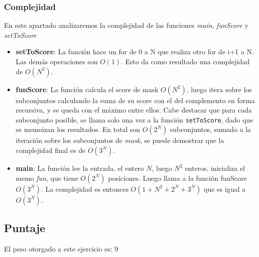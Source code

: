 \subsubsection{Complejidad}

En este apartado analizaremos la complejidad de las funciones \textit{main}, \textit{funScore} y \textit{setToScore}

\begin{itemize}
	\item \textbf{setToScore}: La funci\'on hace un for de 0 a N que realiza otro for de i+1 a N. Las dem\'as operaciones son $O(1)$. Esto da como resultado una complejidad de $O(N^2)$.

	\item \textbf{funScore}: La funci\'on calcula el score de mask $O(N^2)$, luego itera sobre los subconjuntos calculando la suma de su score con el del complemento en forma recursiva, y se queda con el m\'aximo entre ellos.
	Cabe destacar que para cada subconjunto posible, se llama solo una vez a la funci\'on \texttt{setToScore}, dado que se memoizan los resultados. En total son $O(2^N)$ subconjuntos, sumado a la iteraci\'on sobre los subconjuntos de \textit{mask}, se puede demostrar que la complejidad final es de $O(3^N)$.

	\item \textbf{main}: La funci\'on lee la entrada, el entero $N$, luego $N^2$ enteros, inicializa el memo \textit{fun}, que tiene $O(2^N)$ posiciones. Luego llama a la funci\'on funScore $O(3^N)$. La complejidad es entonces $O(1 + N^2 + 2^N + 3^N)$ que es igual a $O(3^N)$.
\end{itemize}

\subsection{Puntaje}
El peso otorgado a este ejercicio es: 9